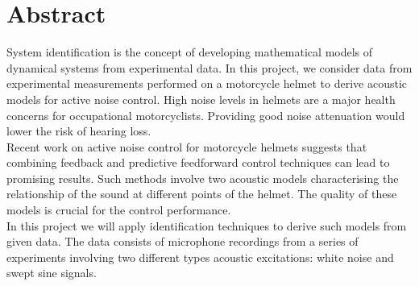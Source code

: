 \chapter*{Abstract}
System identification is the concept of developing mathematical models of dynamical systems from experimental data. In this project, we consider data from experimental measurements performed on a motorcycle helmet to derive acoustic models for active noise control. High noise levels in helmets are a major health concerns for occupational motorcyclists. Providing good noise attenuation would lower the risk of hearing loss.\\

Recent work on active noise control for motorcycle helmets suggests that combining feedback and predictive feedforward control techniques can lead to promising results. Such methods involve two acoustic models characterising the relationship of the sound at different points of the  helmet. The quality of these models is crucial for the control performance.\\

In this project we will apply identification techniques to derive such models from given data. The data consists of microphone recordings from a series of experiments involving two different types acoustic excitations: white noise and swept sine signals. 

\cleardoublepage


